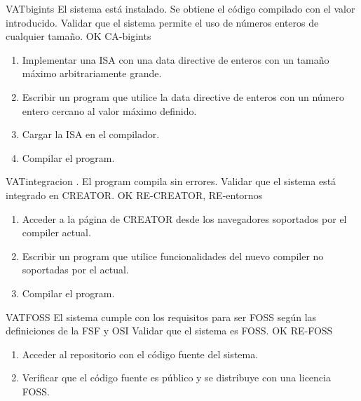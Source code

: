 \begin{testCase}{VAT}{bigints}
    {El sistema está instalado.} %
    {Se obtiene el código compilado con el valor introducido.} %
    {Validar que el sistema permite el uso de números enteros de cualquier tamaño.} %
    {OK} %
    {CA-bigints} %
    \begin{enumerate}[leftmargin=*, topsep=0pt, noitemsep] %
        \item Implementar una \gls{ISA} con una \gls{data directive} de
        enteros con un tamaño máximo arbitrariamente grande.
        \item Escribir un \gls{program} que utilice la \gls{data directive} de
        enteros con un número entero cercano al valor máximo definido.
        \item Cargar la \gls{ISA} en el compilador.
        \item Compilar el \gls{program}.
    \end{enumerate}
\end{testCase}

\begin{testCase}{VAT}{integracion}
    {\NA.} %
    {El \gls{program} compila sin errores.} %
    {Validar que el sistema está integrado en CREATOR.} %
    {OK} %
    {RE-CREATOR, RE-entornos} %
    \begin{enumerate}[leftmargin=*, topsep=0pt, noitemsep] %
        \item Acceder a la página de CREATOR desde los navegadores soportados
        por el \gls{compiler} actual.
        \item Escribir un \gls{program} que utilice funcionalidades del nuevo
        \gls{compiler} no soportadas por el actual.
        \item Compilar el \gls{program}.
    \end{enumerate}
\end{testCase}

\begin{testCase}{VAT}{FOSS}
    {\NA} %
    {El sistema cumple con los requisitos para ser \gls{FOSS} según las
    definiciones de la \gls{FSF} \parencite{FreeSoftware} y \gls{OSI}
    \parencite{OpenSource}} %
    {Validar que el sistema es \gls{FOSS}.} %
    {OK} %
    {RE-FOSS} %
    \begin{enumerate}[leftmargin=*, topsep=0pt, noitemsep] %
        \item Acceder al repositorio con el código fuente del sistema.
        \item Verificar que el código fuente es público y se distribuye con una licencia \gls{FOSS}.
    \end{enumerate}
\end{testCase}

